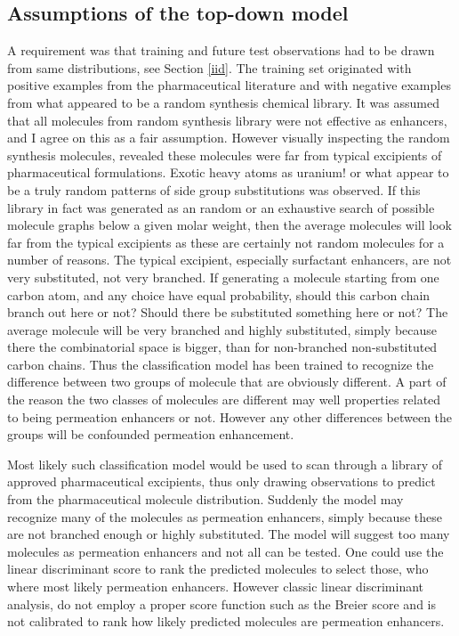 \subsection{Assumptions of the top-down model}
A requirement was that training and future test observations had to be drawn from same distributions, see Section \ref{iid}. The training set originated with positive examples from the pharmaceutical literature and with negative examples from what appeared to be a random synthesis chemical library. It was assumed that all molecules from random synthesis library were not effective as enhancers, and  I agree on this as a fair assumption. However visually inspecting the random synthesis molecules, revealed these molecules were far from typical excipients of pharmaceutical formulations. Exotic heavy atoms as uranium! or what appear to be a truly random patterns of side group substitutions was observed. If this library in fact was generated as an random or an exhaustive search of possible molecule graphs below a given molar weight, then the average molecules will look far from the typical excipients as these are certainly not random molecules for a number of reasons. The typical excipient, especially surfactant enhancers, are not very substituted, not very branched. If generating a molecule starting from one carbon atom, and any choice have equal probability, should this carbon chain branch out here or not? Should there be substituted something here or not? The average molecule will be very branched and highly substituted, simply because there the combinatorial space is bigger, than for non-branched non-substituted carbon chains. Thus the classification model has been trained to recognize the difference between two groups of molecule that are obviously different. A part of the reason the two classes of molecules are different may well properties related to being permeation enhancers or not. However any other differences between the groups will be confounded permeation enhancement.

Most likely such classification model would be used to scan through a library of approved pharmaceutical excipients, thus only drawing observations to predict from the pharmaceutical molecule distribution. Suddenly the model may recognize many of the molecules as permeation enhancers, simply because these are not branched enough or highly substituted. The model will suggest too many molecules as permeation enhancers and not all can be tested. One could use the linear discriminant score to rank the predicted molecules to select those, who where most likely permeation enhancers. However classic linear discriminant analysis, do not employ a proper score function such as the Breier score and is not calibrated to rank how likely predicted molecules are permeation enhancers.

